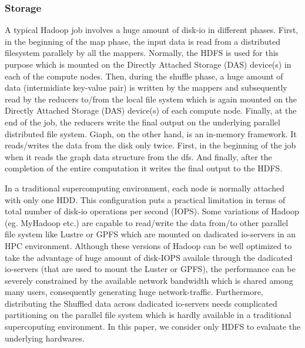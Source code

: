 \documentclass[conference]{IEEEtran}
\begin{document}
\subsubsection {Storage}
A typical Hadoop job involves a huge amount of disk-io in different phases. 
First, in the beginning of the map phase, the input data is read from a distributed filesystem parallely by all the mappers.
Normally, the HDFS is used for this purpose which is mounted on the Directly Attached Storage (DAS) device(s) in each of the compute nodes. 
Then, during the shuffle phase, a huge amount of data (intermidiate key-value pair) is written by the mappers and subsequently read by the reducers to/from the local file system which is again mounted on the Directly Attached Storage (DAS) device(s) of each compute node.
Finally, at the end of the job, the reducers write the final output on the underlying parallel distributed file system.
Giaph, on the other hand, is an in-memory framework. It reads/writes the data from the disk only twice. First, in the beginning of the job when it reads the graph data structure from the dfs. And finally, after the completion of the entire computation it writes the final output to the HDFS.

In a traditional supercomputing environment, each node is normally attached with only one HDD. 
This configuration puts a practical limitation in terms of total number of disk-io operations per second (IOPS).
Some variations of Hadoop (eg. MyHadoop etc.) are capable to read/write the data from/to other parallel file system like Lustre or GPFS which are mounted on dadicated io-servers in an HPC environment. 
Although these versions of Hadoop can be well optimized to take the advantage of huge amount of disk-IOPS availale through the dadicated io-servers (that are used to mount the Luster or GPFS), the performance can be severely constrained by the available network bandwidth which is shared among many users, consequently generating huge network-traffic.
Furthermore, distributing the Shuffled data across dadicated io-servers needs complicated partitioning on the parallel file system which is hardly available in a traditional supercoputing environment.
In this paper, we consider only HDFS to evaluate the underlying hardwares.
\end{document}
